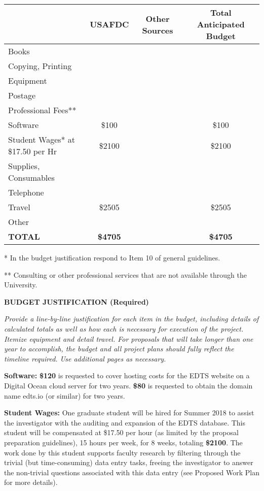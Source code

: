 \documentclass[11pt]{article}
\begin{document}
\begin{center}
\begin{tabular}{|l|c|c|c|}
  \hline
  & USAFDC & Other Sources & Total Anticipated Budget \\\hline
  Books &&& \\\hline
  Copying, Printing &&& \\\hline
  Equipment &&& \\\hline
  Postage &&& \\\hline
  Professional Fees** &&& \\\hline
  Software & \$100 && \$100 \\\hline
  \parbox{1.5in}{Student Wages*\\ at \$17.50 per Hr} & \$2100 && \$2100 \\\hline
  Supplies, Consumables &&& \\\hline
  Telephone &&& \\\hline
  Travel & \$2505 && \$2505 \\\hline
  Other &&& \\\hline\hline
  \textbf{TOTAL} & \textbf{\$4705} && \textbf{\$4705} \\\hline
\end{tabular}
\end{center}

* In the budget justification respond to Item 10 of general guidelines.

** Consulting or other professional services that are not available through the University.

\newpage




\centerline{\bf\Large
BUDGET JUSTIFICATION (Required)
}

\textit{Provide a line-by-line justification for each item in the budget, including details of calculated totals as well as how each is necessary for execution of the project.  Itemize equipment and detail travel. For proposals that will take longer than one year to accomplish, the budget and all project plans should fully reflect the timeline required.  Use additional pages as necessary.}\vspace{2em}

\textbf{Software:} \textbf{\$120} is requested to cover hosting costs for the EDTS website on a Digital Ocean cloud server for two years. \textbf{\$80} is requested to obtain the domain name edts.io (or similar) for two years.

\textbf{Student Wages:} One graduate student will be hired for Summer 2018 to assist the investigator with the auditing and expansion of the EDTS database. This student will be compensated at \$17.50 per hour (as limited by the proposal preparation guidelines), 15 hours per week, for 8 weeks, totaling \textbf{\$2100}. The work done by this student supports faculty research by filtering through the trivial (but time-consuming) data entry tasks, freeing the investigator to answer the non-trivial questions associated with this data entry (see Proposed Work Plan for more details).
\end{document}

